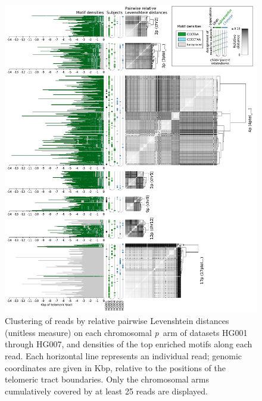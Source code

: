 \documentclass{article}
\begin{document}
                \begin{figure}[h!] \centering %
                \includegraphics[height=.88\textheight,width=\textwidth,keepaspectratio]{../figures/Figure_4.pdf} %
                \caption{ %
                    \small Clustering of reads by relative pairwise Levenshtein distances (unitless measure) %
                    on each chromosomal \mbox{\textit{p} arm} of datasets HG001 through HG007, %
                    and densities of the top enriched motifs along each read. %
                    Each horizontal line represents an individual read; %
                    genomic coordinates are given in Kbp, relative to the positions of the telomeric tract boundaries. %
                    Only the chromosomal arms cumulatively covered by at least 25 reads are displayed. %
                } %
                \label{fig:haplotypes_p} %
                \end{figure} %
\end{document}
